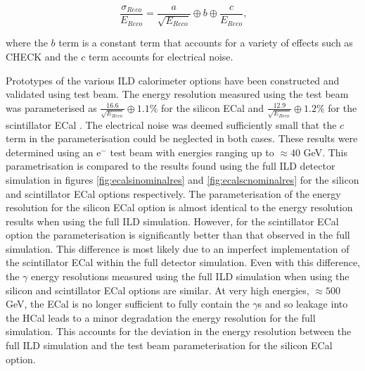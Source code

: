 \begin{equation} 
\frac{\sigma_{Reco}}{E_{Reco}} = \frac{a}{\sqrt{E_{Reco}}} \oplus b \oplus \frac{c}{E_{Reco}}\text{,}
\end{equation}

\begin{flushleft}
where the $b$ term is a constant term that accounts for a variety of effects such as CHECK and the $c$ term accounts for electrical noise.
\end{flushleft}

Prototypes of the various ILD calorimeter options have been constructed and validated using test beam.  The energy resolution measured using the test beam was parameterised as $\frac{16.6}{\sqrt{E_{Reco}}} \oplus 1.1 \%$ for the silicon ECal and $\frac{12.9}{\sqrt{E_{Reco}}} \oplus 1.2 \%$ for the scintillator ECal \cite{Behnke:2013lya}.  The electrical noise was deemed sufficiently small that the $c$ term in the parameterisation could be neglected in both cases.  These results were determined using an $\text{e}^{-}$ test beam with energies ranging up to $\approx 40$ GeV.  This parametrisation is compared to the results found using the full ILD detector simulation in figures \ref{fig:ecalsinominalres} and \ref{fig:ecalscnominalres} for the silicon and scintillator ECal options respectively.  The parameterisation of the energy resolution for the silicon ECal option is almost identical to the energy resolution results when using the full ILD simulation.  However, for the scintillator ECal option the parameterisation is significantly better than that observed in the full simulation.  This difference is most likely due to an imperfect implementation of the scintillator ECal within the full detector simulation.  Even with this difference, the $\gamma$ energy resolutions measured using the full ILD simulation when using the silicon and scintillator ECal options are similar.  At very high energies, $\approx 500$ GeV, the ECal is no longer sufficient to fully contain the $\gamma$s and so leakage into the HCal leads to a minor degradation the energy resolution for the full simulation.  This accounts for the deviation in the energy resolution between the full ILD simulation and the test beam parameterisation for the silicon ECal option.   

